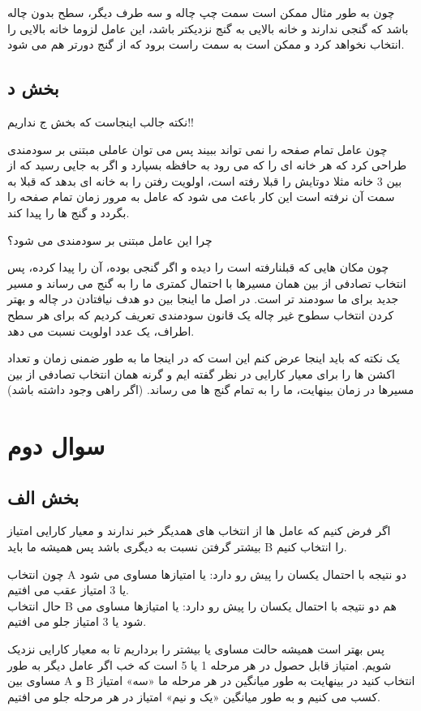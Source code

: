 \documentclass[paper=a4, fontsize=11pt]{article}
\begin{document}
چون به طور مثال ممکن است سمت چپ چاله و سه طرف دیگر، سطح بدون چاله باشد که گنجی ندارند و خانه بالایی به گنج نزدیکتر باشد، این عامل لزوما خانه بالایی را انتخاب نخواهد کرد و ممکن است به سمت راست برود که از گنج دورتر هم می شود.
\subsection{بخش د}
نکته جالب اینجاست که بخش ج نداریم!!

چون عامل تمام صفحه را نمی تواند ببیند پس می توان عاملی مبتنی بر سودمندی طراحی کرد که هر خانه ای را که می رود به حافظه بسپارد و اگر به جایی رسید که  از بین 3 خانه مثلا دوتایش را قبلا رفته است، اولویت رفتن را به خانه ای بدهد که قبلا به سمت آن نرفته است این کار باعث می شود که عامل به مرور زمان تمام صفحه را بگردد و گنج ها را پیدا کند.

چرا این عامل مبتنی بر سودمندی می شود؟

چون مکان هایی که قبلنارفته است را دیده و اگر گنجی بوده، آن را پیدا کرده، پس انتخاب تصادفی از بین همان مسیرها با احتمال کمتری ما را به گنج می رساند و مسیر جدید برای ما سودمند تر است. در اصل ما اینجا بین دو هدف نیافتادن در چاله و بهتر کردن انتخاب سطوح غیر چاله یک قانون سودمندی تعریف کردیم که برای هر سطح اطراف، یک عدد اولویت نسبت می دهد.

یک نکته که باید اینجا عرض کنم این است که در اینجا ما به طور ضمنی زمان و تعداد اکشن ها را برای معیار کارایی در نظر گفته ایم و گرنه همان انتخاب تصادفی از بین مسیرها در زمان بینهایت، ما را به تمام گنج ها می رساند. (اگر راهی وجود داشته باشد)

\section{سوال دوم}
\subsection{بخش الف}
اگر فرض کنیم که عامل ها از انتخاب های همدیگر خبر ندارند و معیار کارایی امتیاز بیشتر گرفتن نسبت به دیگری باشد پس همیشه ما باید B را انتخاب کنیم.

چون انتخاب A دو نتیجه با احتمال یکسان را پیش رو دارد: یا امتیازها مساوی می شود یا 3 امتیاز عقب می افتیم. \\
حال انتخاب B  هم دو نتیجه با احتمال یکسان را پیش رو دارد: یا امتیازها مساوی می شود یا 3 امتیاز جلو می افتیم.

پس بهتر است همیشه حالت مساوی یا بیشتر را برداریم تا به معیار کارایی نزدیک شویم.
امتیاز قابل حصول در هر مرحله 1 یا 5 است که خب اگر عامل دیگر به طور مساوی بین A و B انتخاب کنید در بینهایت به طور میانگین در هر مرحله ما «سه» امتیاز کسب می کنیم و به طور میانگین «یک و نیم» امتیاز در هر مرحله جلو می افتیم.
\end{document}
